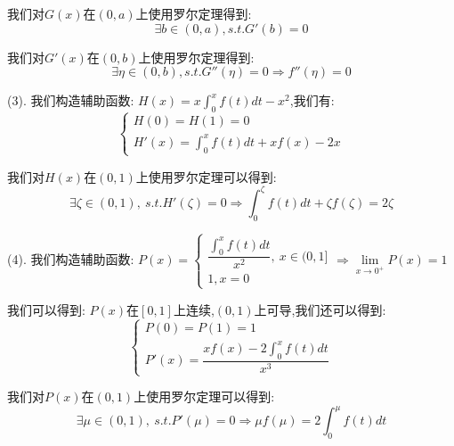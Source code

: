 \begin{solution}
	我们对$G(x)$在$(0,a)$上使用罗尔定理得到:  
	$$\exists b\in(0,a),s.t. G'(b)=0$$
	
	我们对$G'(x)$在$(0,b)$上使用罗尔定理得到:  
	$$\exists \eta\in(0,b),s.t. G''(\eta)=0\Rightarrow f''(\eta)=0$$
	
	(3). 我们构造辅助函数:  $H(x)=x\int_{0}^{x}f(t)dt-x^2$,我们有:  
	$$\left\lbrace
	\begin{array}{l}
		H(0)=H(1)=0\\
		H'(x)=\int_{0}^{x}f(t)dt+xf(x)-2x
	\end{array}
	\right. $$
	
	我们对$H(x)$在$(0,1)$上使用罗尔定理可以得到:  
	$$\exists \zeta\in(0,1),\ s.t. H'(\zeta)=0\Rightarrow \int_{0}^{\zeta}f(t)dt+\zeta f(\zeta)=2\zeta$$
	
	(4). 我们构造辅助函数:  $P(x)=\left\lbrace
	\begin{array}{l}
		\dfrac{\int_{0}^{x}f(t)dt}{x^2},\ x\in(0,1]\\
		1,x=0
	\end{array}
	\right. \Rightarrow \lim\limits_{x\to 0^{+}}P(x)=1$
	
	我们可以得到:  $P(x)$在$[0,1]$上连续,$(0,1)$上可导,我们还可以得到:  
	$$\left\lbrace
	\begin{array}{l}
		P(0)=P(1)=1\\
		P'(x)=\dfrac{xf(x)-2\int_{0}^{x}f(t)dt}{x^3}
	\end{array}
	\right. $$
	
	我们对$P(x)$在$(0,1)$上使用罗尔定理可以得到:  
	$$\exists \mu\in(0,1),\ s.t. P'(\mu)=0\Rightarrow \mu f(\mu)=2\int_{0}^{\mu}f(t)dt$$
\end{solution}
